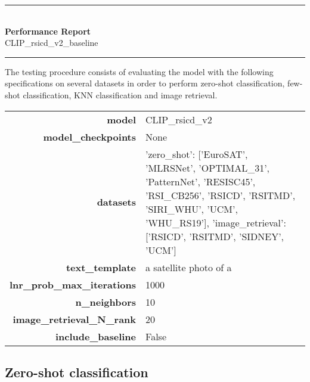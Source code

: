 \documentclass[11pt]{article}
\begin{document}
\thispagestyle{empty} 

\newcommand{\HRule}{\rule{\linewidth}{0.3mm}}
\begin{centering}
\HRule \\[0.5cm]
{\Huge \bfseries Performance Report}\\[0.3cm] 
{\Large CLIP\_rsicd\_v2\_baseline}\\[0.3cm] 
\HRule
\vspace{0.5cm}
\end{centering}

\noindent
The testing procedure consists of evaluating the model with the following specifications on several datasets in order to perform zero-shot classification, few-shot classification, KNN classification and image retrieval.

\begin{table}[H]
\centering
\begin{tabularx}{\columnwidth}{r|X}
\textbf{model} & CLIP\_rsicd\_v2 \\
\textbf{model\_checkpoints} & None \\
\textbf{datasets} & {'zero\_shot': ['EuroSAT', 'MLRSNet', 'OPTIMAL\_31', 'PatternNet', 'RESISC45', 'RSI\_CB256', 'RSICD', 'RSITMD', 'SIRI\_WHU', 'UCM', 'WHU\_RS19'], 'image\_retrieval': ['RSICD', 'RSITMD', 'SIDNEY', 'UCM']} \\
\textbf{text\_template} & a satellite photo of a  \\
\textbf{lnr\_prob\_max\_iterations} & 1000 \\
\textbf{n\_neighbors} & 10 \\
\textbf{image\_retrieval\_N\_rank} & 20 \\
\textbf{include\_baseline} & False \\
\end{tabularx}

\end{table}



\subsection*{Zero-shot classification}
\end{document}

